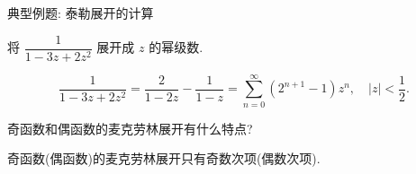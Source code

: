 \begin{frame}{典型例题: 泰勒展开的计算}
	\onslide<+->
	\begin{exercise}
		将 $\dfrac1{1-3z+2z^2}$ 展开成 $z$ 的幂级数.
	\end{exercise}

	\onslide<+->
	\begin{answer}
	\[
		\frac1{1-3z+2z^2}=\frac{2}{1-2z}-\frac1{1-z}
		=\sum_{n=0}^\infty(2^{n+1}-1)z^n,\quad |z|<\frac12.
	\]
	\end{answer}
	
	\onslide<+->
	\begin{thinking}
		奇函数和偶函数的麦克劳林展开有什么特点?
	\end{thinking}

	\onslide<+->
	\begin{answer}
		奇函数(偶函数)的麦克劳林展开只有奇数次项(偶数次项).
	\end{answer}
\end{frame}

